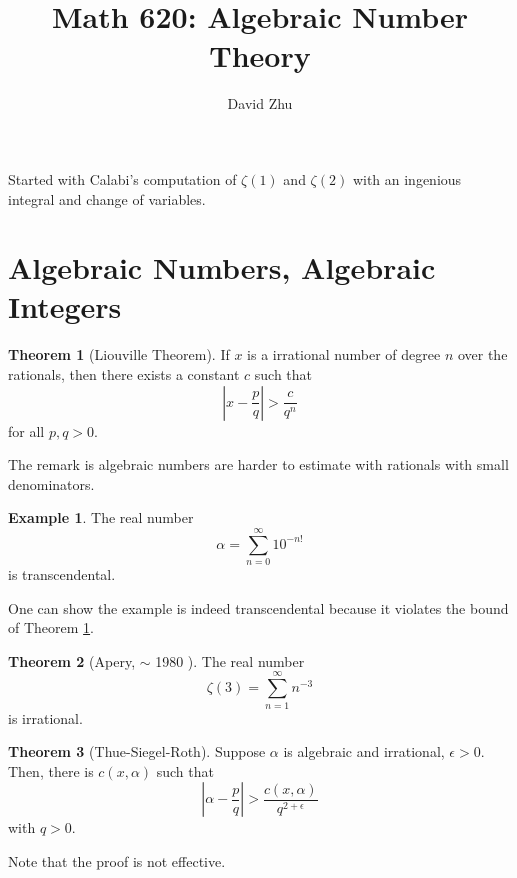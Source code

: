 \documentclass{article}
\title{Math 620: Algebraic Number Theory}
\author{David Zhu}
\theoremstyle{definition}
\newtheorem{theorem}{Theorem}[section]
\theoremstyle{definition}
\theoremstyle{definition}
\theoremstyle{definition}
\theoremstyle{definition}
\theoremstyle{definition}
\theoremstyle{definition}
\newtheorem{example}{Example}[theorem]
\begin{document}
\maketitle

Started with Calabi's computation of $\zeta(1)$ and $\zeta(2)$ with an ingenious integral and change of variables. 



\section{Algebraic Numbers, Algebraic Integers}



\begin{tcolorbox}[colback=red!5!white,colframe=red!30!white]
\begin{theorem}[Liouville Theorem]
\label{Liouville}
If $x$ is a irrational number of degree $n$ over the rationals, then there exists a constant $c$ such that 
\[|x-\frac{p}{q}|>\frac{c}{q^n}\]
for all $p,q>0$.
\end{theorem}
\end{tcolorbox}


The remark is algebraic numbers are harder to estimate with rationals with small denominators. 


\begin{tcolorbox}[colback=yellow!5!white,colframe=yellow!30!white]
\begin{example}
The real number 
\[\alpha= \sum_{n=0}^{\infty}10^{-n!}\]
is transcendental.
\end{example}
\end{tcolorbox}
One can show the example is indeed transcendental because it violates the bound of Theorem \ref{Liouville}. 


\begin{tcolorbox}[colback=red!5!white,colframe=red!30!white]
\begin{theorem}[Apery, $\sim$ 1980 ]
The real number 
\[\zeta(3)=\sum_{n=1}^{\infty}n^{-3}\] is irrational. 
\end{theorem}
\end{tcolorbox}


\begin{tcolorbox}[colback=red!5!white,colframe=red!30!white]
\begin{theorem}[Thue-Siegel-Roth]
    Suppose $\alpha$ is algebraic and irrational, $\epsilon>0$. Then, there is $c(x,\alpha)$ such that 
    \[|\alpha-\frac{p}{q}|> \frac{c(x,\alpha)}{q^{2+\epsilon}}\]
with $q>0$. 
\end{theorem}
\end{tcolorbox}
Note that the proof is not effective. 
\end{document}
